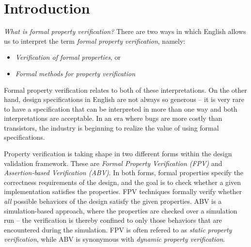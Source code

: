 
\chapter{Introduction}

{\em What is formal property verification?} There are two ways in which English
allows us to interpret the term {\em formal property verification}, namely:
\begin{itemize}

\item {\em Verification of formal properties}, or
\item {\em Formal methods for property verification}

\end{itemize}
Formal property verification relates to both of these interpretations. On the
other hand, design specifications in English are not always so generous -- 
it is very rare to have a specification that can be interpreted in more than
one way and both interpretations are acceptable. In an era where bugs are more
costly than transistors, the industry is beginning to realize the value of 
using formal specifications.

Property verification is taking shape in two different forms within the design
validation framework. These are {\em Formal Property Verification (FPV)} and
{\em Assertion-based Verification (ABV)}. In both forms, formal properties 
specify the correctness requirements of the design, and the goal is to check 
whether a given implementation satisfies the properties. FPV techniques 
formally verify whether {\em all} possible behaviors of the design satisfy the 
given properties. ABV is a simulation-based approach, where the properties are 
checked over a simulation run -- the verification is thereby confined to only 
those behaviors that are encountered during the simulation. FPV is often
refered to as {\em static property verification}, while ABV is synonymous
with {\em dynamic property verification}. 

